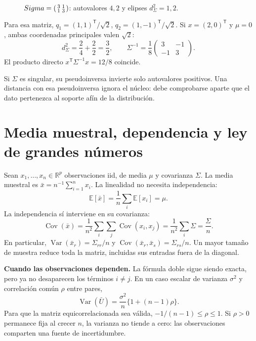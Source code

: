 \documentclass[11pt,a4paper]{article}
\newcommand{\R}{\mathbb R}
\newcommand{\E}{\mathbb E}
\newcommand{\T}{^{\mathsf T}}
\DeclareMathOperator{\Var}{Var}
\DeclareMathOperator{\Cov}{Cov}
\newcommand{\topic}[2]{\clearpage\section{#1}\label{#2}}
\theoremstyle{definition}\newtheorem{definicion}[teorema]{Definición}
\begin{document}
\begin{figure}[H]\centering
{}
\caption{$\Sigma=\begin{psmallmatrix}3&1\\1&3\end{psmallmatrix}$: autovalores $4,2$ y elipses $d_\Sigma^2=1,2$.}
\end{figure}
\begin{ejemplo}
Para esa matriz, $q_1=(1,1)\T/\sqrt2$, $q_2=(1,-1)\T/\sqrt2$.
Si $x=(2,0)\T$ y $\mu=0$, ambas coordenadas principales valen $\sqrt2$:
\[
d_\Sigma^2=\frac24+\frac22=\frac32,\qquad
\Sigma^{-1}=\frac18\begin{pmatrix}3&-1\\-1&3\end{pmatrix}.
\]
El producto directo $x\T\Sigma^{-1}x=12/8$ coincide.
\end{ejemplo}
Si $\Sigma$ es singular, su pseudoinversa invierte solo autovalores
positivos. Una distancia con esa pseudoinversa ignora el núcleo: debe
comprobarse aparte que el dato pertenezca al soporte afín de la distribución.

\topic{Media muestral, dependencia y ley de grandes números}{s23}
Sean $x_1,\ldots,x_n\in\R^p$ observaciones iid, de media $\mu$ y
covarianza $\Sigma$. La media muestral es
$\bar x=n^{-1}\sum_{i=1}^nx_i$.
La linealidad no necesita independencia:
\[
\E[\bar x]=\frac1n\sum_i\E[x_i]=\mu.
\]
La independencia sí interviene en su covarianza:
\[
\Cov(\bar x)
=\frac1{n^2}\sum_i\sum_j\Cov(x_i,x_j)
=\frac1{n^2}\sum_i\Sigma
=\boxed{\frac{\Sigma}{n}}.
\]
En particular,
$\Var(\bar x_r)=\Sigma_{rr}/n$ y
$\Cov(\bar x_r,\bar x_s)=\Sigma_{rs}/n$.
Un mayor tamaño de muestra reduce toda la matriz, incluidas sus entradas
fuera de la diagonal.

\textbf{Cuando las observaciones dependen.}
La fórmula doble sigue siendo exacta, pero ya no desaparecen los términos
$i\ne j$. En un caso escalar de varianza $\sigma^2$ y correlación común
$\rho$ entre pares,
\[
\Var(\bar U)=\frac{\sigma^2}{n}\{1+(n-1)\rho\}.
\]
Para que la matriz equicorrelacionada sea válida,
$-1/(n-1)\le\rho\le1$.
Si $\rho>0$ permanece fija al crecer $n$, la varianza no tiende a cero:
las observaciones comparten una fuente de incertidumbre.
\end{document}
